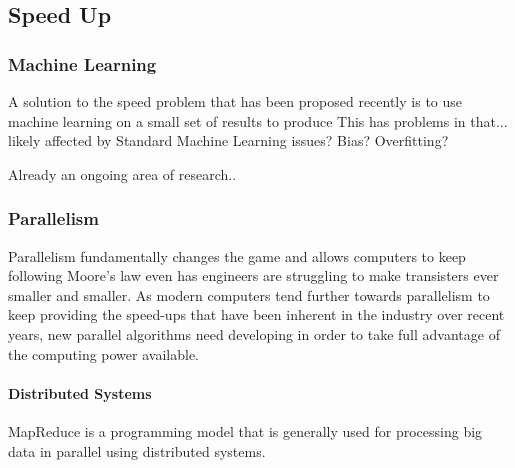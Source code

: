 \documentclass{UoYCSproject}
\begin{document}
\subsection{Speed Up}

\subsubsection{Machine Learning}
A solution to the speed problem that has been proposed recently is to use machine learning on a small set of results to produce\cite{kieran_machine_learning}
This has problems in that...
likely affected by Standard Machine Learning issues? Bias? Overfitting?

Already an ongoing area of research.. 


\subsubsection{Parallelism}
Parallelism fundamentally changes the game and allows computers to keep following Moore's law even has engineers are struggling to make transisters ever smaller and smaller\cite{concurrency_revolution}. As modern computers tend further towards parallelism to keep providing the speed-ups that have been inherent in the industry over recent years, new parallel algorithms need developing in order to take full advantage of the computing power available.


\paragraph{Distributed Systems}
MapReduce is a programming model that is generally used for processing big data in parallel using distributed systems.
\end{document}
